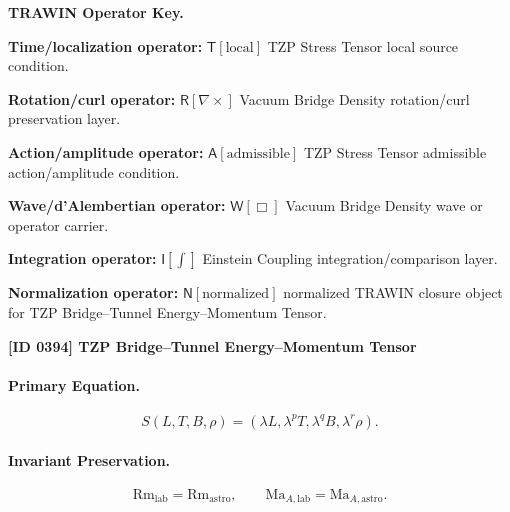 \par\vspace{0.45\baselineskip}
\noindent\begin{minipage}[t]{\linewidth}
\begingroup
\small
\raggedright
\textbf{TRAWIN Operator Key.}\par
\noindent\textbf{Time/localization operator:} $\mathsf{T}\!\left[\mathrm{local}\right]$ TZP Stress Tensor local source condition.\par
\noindent\textbf{Rotation/curl operator:} $\mathsf{R}\!\left[\nabla\times\right]$ Vacuum Bridge Density rotation/curl preservation layer.\par
\noindent\textbf{Action/amplitude operator:} $\mathsf{A}\!\left[\mathrm{admissible}\right]$ TZP Stress Tensor admissible action/amplitude condition.\par
\noindent\textbf{Wave/d'Alembertian operator:} $\mathsf{W}\!\left[\Box\right]$ Vacuum Bridge Density wave or operator carrier.\par
\noindent\textbf{Integration operator:} $\mathsf{I}\!\left[\int\right]$ Einstein Coupling integration/comparison layer.\par
\noindent\textbf{Normalization operator:} $\mathsf{N}\!\left[\mathrm{normalized}\right]$ normalized TRAWIN closure object for TZP Bridge--Tunnel Energy--Momentum Tensor.\par
\endgroup
\end{minipage}

\clearpage
\noindent\textbf{[ID 0394] TZP Bridge--Tunnel Energy--Momentum Tensor}\par
\vspace{0.35em}
\paragraph{Primary Equation.}
\begin{equation}
S(L,T,B,\rho)
=
(\lambda L,\lambda^{p}T,\lambda^{q}B,\lambda^{r}\rho).
\end{equation}

\paragraph{Invariant Preservation.}
\begin{equation}
\mathrm{Rm}_{\mathrm{lab}}=\mathrm{Rm}_{\mathrm{astro}},
\qquad
\mathrm{Ma}_{A,\mathrm{lab}}=\mathrm{Ma}_{A,\mathrm{astro}}.
\end{equation}


